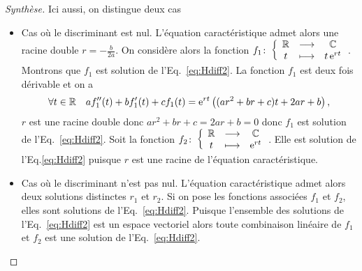 \begin{proof}[Synthèse]
  Ici aussi, on distingue deux cas
\begin{itemize}
\item Cas où le discriminant est nul. L'équation caractéristique admet alors une racine double $r=-\frac{b}{2a}$. On considère alors la fonction $f_1\colon \left\{\begin{array}{ccc} \mathbb{R} & \longrightarrow &\mathbb{C}\\ t & \longmapsto & t\operatorname{e}^{rt} \end{array} \right.$. Montrons que $f_1$ est solution de l'Eq.~\eqref{eq:Hdiff2}. La fonction $f_1$ est deux fois dérivable et on a 
  \begin{equation}
    \forall t \in \mathbb{R}  \quad af_1''(t)+bf_1'(t)+cf_1(t)=\operatorname{e}^{rt} \left( (ar^2+br+c)t + 2ar+b \right),
  \end{equation}
$r$ est une racine double donc $ar^2+br+c=2ar+b=0$ donc $f_1$ est solution de l'Eq.~\eqref{eq:Hdiff2}. Soit la fonction $f_2\colon \left\{\begin{array}{ccc} \mathbb{R} & \longrightarrow &\mathbb{C}\\ t & \longmapsto & \operatorname{e}^{rt} \end{array} \right.$. Elle est solution de l'Eq.\eqref{eq:Hdiff2} puisque $r$ est une racine de l'équation caractéristique.
\item Cas où le discriminant n'est pas nul. L'équation caractéristique admet alors deux solutions distinctes $r_1$ et $r_2$. Si on pose les fonctions associées $f_1$ et $f_2$, elles sont solutions de l'Eq.~\eqref{eq:Hdiff2}. Puisque l'ensemble des solutions de l'Eq.~\eqref{eq:Hdiff2} est un espace vectoriel alors toute combinaison linéaire de $f_1$ et $f_2$ est une solution de l'Eq.~\eqref{eq:Hdiff2}.
\end{itemize}
\end{proof}
%
